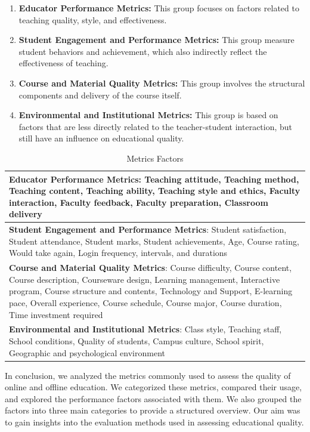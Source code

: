 \begin{enumerate}
    \item \textbf{Educator Performance Metrics:} This group focuses on factors related to teaching quality, style, and effectiveness.
    \item \textbf{Student Engagement and Performance Metrics:} This group measure student behaviors and achievement, which also indirectly reflect the effectiveness of teaching.
    \item \textbf{Course and Material Quality Metrics:} This group involves the structural components and delivery of the course itself.
    \item \textbf{Environmental and Institutional Metrics:} This group is based on factors that are less directly related to the teacher-student interaction, but still have an influence on educational quality.
\end{enumerate}



\begin{table}[h]
\caption{Metrics Factors}
\label{Metrics factors}
\begin{tabular}{p{}}
\hline
\textbf{Educator Performance Metrics}: Teaching attitude, Teaching method, Teaching content, Teaching ability, Teaching style and ethics, Faculty interaction, Faculty feedback, Faculty preparation, Classroom delivery \\
\hline
\textbf{Student Engagement and Performance Metrics}: Student satisfaction, Student attendance, Student marks, Student achievements, Age, Course rating, Would take again, Login frequency, intervals, and durations \\
\hline
\textbf{Course and Material Quality Metrics}: Course difficulty, Course content, Course description, Courseware design, Learning management, Interactive program, Course structure and contents, Technology and Support, E-learning pace, Overall experience, Course schedule, Course major, Course duration, Time investment required \\
\hline
\textbf{Environmental and Institutional Metrics}: Class style, Teaching staff, School conditions, Quality of students, Campus culture, School spirit, Geographic and psychological environment \\
\hline
\end{tabular}
\end{table}



In conclusion, we analyzed the metrics commonly used to assess the quality of online and offline education. We categorized these metrics, compared their usage, and explored the performance factors associated with them. We also grouped the factors into three main categories to provide a structured overview. Our aim was to gain insights into the evaluation methods used in assessing educational quality.




